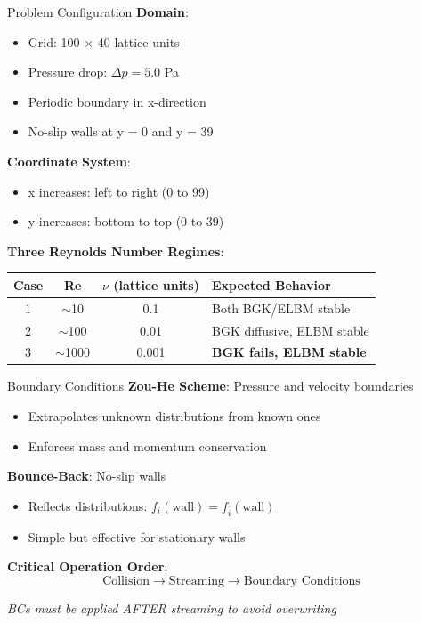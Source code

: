 \documentclass[aspectratio=169]{beamer}
\begin{document}
\begin{frame}{Problem Configuration}
\textbf{Domain}:
\begin{itemize}
    \item Grid: 100 $\times$ 40 lattice units
    \item Pressure drop: $\Delta p = 5.0$ Pa
    \item Periodic boundary in x-direction
    \item No-slip walls at y = 0 and y = 39
\end{itemize}

\vspace{0.3cm}
\textbf{Coordinate System}:
\begin{itemize}
    \item x increases: left to right (0 to 99)
    \item y increases: bottom to top (0 to 39)
\end{itemize}

\vspace{0.3cm}
\textbf{Three Reynolds Number Regimes}:
\begin{table}
\centering
\small
\begin{tabular}{cccl}
\toprule
Case & Re & $\nu$ (lattice units) & Expected Behavior \\
\midrule
1 & $\sim$10 & 0.1 & Both BGK/ELBM stable \\
2 & $\sim$100 & 0.01 & BGK diffusive, ELBM stable \\
3 & $\sim$1000 & 0.001 & \textbf{BGK fails, ELBM stable} \\
\bottomrule
\end{tabular}
\end{table}
\end{frame}

\begin{frame}{Boundary Conditions}
\textbf{Zou-He Scheme}: Pressure and velocity boundaries
\begin{itemize}
    \item Extrapolates unknown distributions from known ones
    \item Enforces mass and momentum conservation
\end{itemize}

\vspace{0.3cm}
\textbf{Bounce-Back}: No-slip walls
\begin{itemize}
    \item Reflects distributions: $f_i(\text{wall}) = f_{\bar{i}}(\text{wall})$
    \item Simple but effective for stationary walls
\end{itemize}

\vspace{0.3cm}
\textbf{Critical Operation Order}:
$$\text{Collision} \rightarrow \text{Streaming} \rightarrow \text{Boundary Conditions}$$

\vspace{0.2cm}
\textit{BCs must be applied AFTER streaming to avoid overwriting}
\end{frame}
\end{document}
